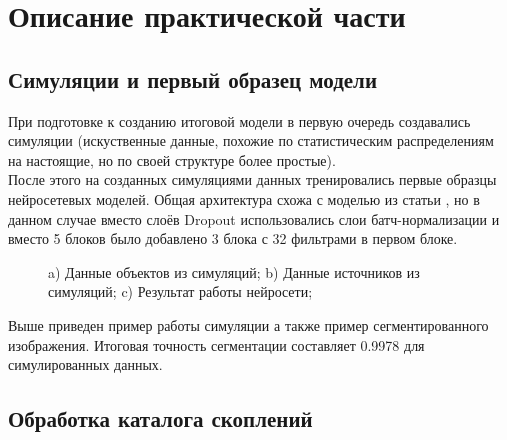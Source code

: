 \chapter{Описание практической части}
\label{cha:ch_4}

\section{Симуляции и первый образец модели}

При подготовке к созданию итоговой модели в первую очередь создавались симуляции (искуственные 
данные, похожие по статистическим распределениям на настоящие, но по своей структуре более простые). \\

После этого на созданных симуляциями данных тренировались первые образцы нейросетевых моделей. 
Общая архитектура схожа с моделью из статьи \cite{Bonjean}, но в данном случае вместо слоёв Dropout 
использовались слои батч-нормализации и вместо 5 блоков было добавлено 3 блока с 32 фильтрами в 
первом блоке. \\

\begin{figure}
	\begin{minipage}[h]{0.32\linewidth}
	\end{minipage}
	\begin{minipage}[h]{0.32\linewidth}
	\end{minipage}
	\begin{minipage}[h]{0.32\linewidth}
	\end{minipage}

	\caption{a) Данные объектов из симуляций; b) Данные источников из симуляций; 
		c) Результат работы нейросети;}
\end{figure}

Выше приведен пример работы симуляции а также пример сегментированного изображения. Итоговая точность 
сегментации составляет 0.9978 для симулированных данных.\\

\section{Обработка каталога скоплений}

